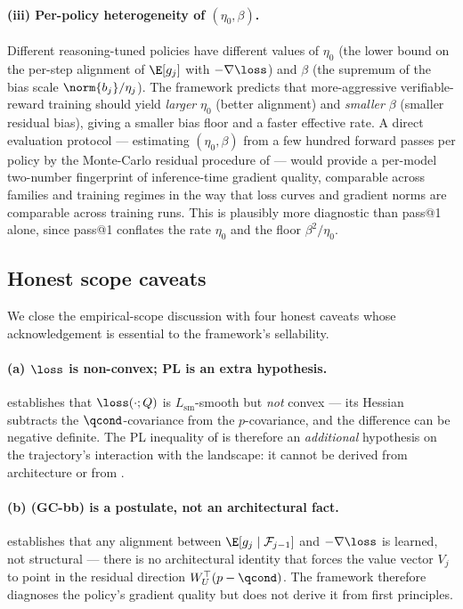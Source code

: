 \paragraph{(iii) Per-policy heterogeneity of $(\eta_0, \beta)$.}
Different reasoning-tuned policies have different values of $\eta_0$
(the lower bound on the per-step alignment of $\E[g_j]$ with $-\nabla \loss$)
and $\beta$ (the supremum of the bias scale $\norm{b_j}/\eta_j$). The
framework predicts that more-aggressive verifiable-reward training
should yield \emph{larger} $\eta_0$ (better alignment) and \emph{smaller}
$\beta$ (smaller residual bias), giving a smaller bias floor and a
faster effective rate. A direct evaluation protocol --- estimating
$(\eta_0, \beta)$ from a few hundred forward passes per policy by the
Monte-Carlo residual procedure of  --- would
provide a per-model two-number fingerprint of inference-time gradient
quality, comparable across families and training regimes in the way that
loss curves and gradient norms are comparable across training runs.
This is plausibly more diagnostic than pass@1 alone, since pass@1
conflates the rate $\eta_0$ and the floor $\beta^2 / \eta_0$.

\subsection{Honest scope caveats}
\label{sec:discussion_caveats}

We close the empirical-scope discussion with four honest caveats whose
acknowledgement is essential to the framework's sellability.

\paragraph{(a) $\loss$ is non-convex; PL is an extra hypothesis.}
 establishes that $\loss(\cdot; Q)$ is
$L_{\mathrm{sm}}$-smooth but \emph{not} convex --- its Hessian subtracts
the $\qcond$-covariance from the $p$-covariance, and the difference can
be negative definite. The PL inequality of 
is therefore an \emph{additional} hypothesis on the trajectory's
interaction with the landscape: it cannot be derived from architecture or
from .

\paragraph{(b) (GC-bb) is a postulate, not an architectural fact.}
 establishes that any alignment between
$\E[g_j \mid \mathcal F_{j-1}]$ and $-\nabla \loss$ is learned, not
structural --- there is no architectural identity that forces the value
vector $V_j$ to point in the residual direction $W_U^\top (p - \qcond)$.
The framework therefore diagnoses the policy's gradient quality but
does not derive it from first principles.


